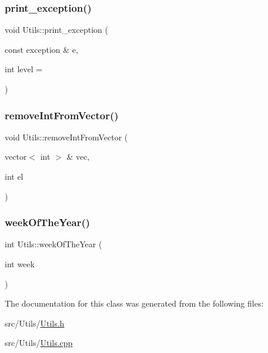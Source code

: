 \subsubsection{\texorpdfstring{print\+\_\+exception()}{print\_exception()}}
{\footnotesize\ttfamily void Utils\+::print\+\_\+exception (\begin{DoxyParamCaption}\item[{const exception \&}]{e,  }\item[{int}]{level = {} }\end{DoxyParamCaption})\hspace{0.3cm}{\ttfamily [static]}}

\mbox{\label{classUtils_a01a90cec5c722c66a0d75d051f48dd03}} 
\subsubsection{\texorpdfstring{remove\+Int\+From\+Vector()}{removeIntFromVector()}}
{\footnotesize\ttfamily void Utils\+::remove\+Int\+From\+Vector (\begin{DoxyParamCaption}\item[{vector$<$ int $>$ \&}]{vec,  }\item[{int}]{el }\end{DoxyParamCaption})\hspace{0.3cm}{\ttfamily [static]}}

\mbox{\label{classUtils_a8318227e82678b727c4de0dda180e64a}} 
\subsubsection{\texorpdfstring{week\+Of\+The\+Year()}{weekOfTheYear()}}
{\footnotesize\ttfamily int Utils\+::week\+Of\+The\+Year (\begin{DoxyParamCaption}\item[{int}]{week }\end{DoxyParamCaption})\hspace{0.3cm}{\ttfamily [static]}}



The documentation for this class was generated from the following files\+:\begin{DoxyCompactItemize}
\item 
src/\+Utils/\mbox{\hyperlink{Utils_8h}{Utils.\+h}}\item 
src/\+Utils/\mbox{\hyperlink{Utils_8cpp}{Utils.\+cpp}}\end{DoxyCompactItemize}
